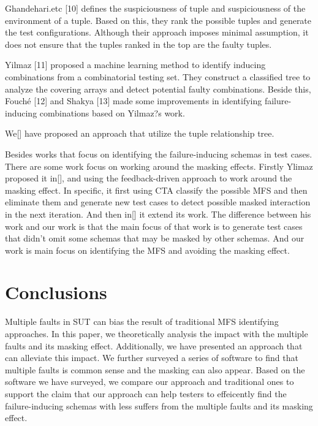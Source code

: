\documentclass{sig-alternate}
\begin{document}
Ghandehari.etc [10] defines the suspiciousness of tuple and suspiciousness of the environment of a tuple. Based on this, they rank the possible tuples and generate the test configurations. Although their approach imposes minimal assumption, it does not ensure that the tuples ranked in the top are the faulty tuples.

Yilmaz [11] proposed a machine learning method to identify inducing combinations from a combinatorial testing set. They construct a classified tree to analyze the covering arrays and detect potential faulty combinations. Beside this, Fouché [12] and Shakya [13] made some improvements in identifying failure-inducing combinations based on Yilmaz?s work.

We[] have proposed an approach that utilize the tuple relationship tree.

Besides works that focus on identifying the failure-inducing schemas in test cases. There are some work focus on working around the masking effects. Firstly Ylimaz proposed it in[], and using the feedback-driven approach to work around the masking effect. In specific, it first using CTA classify the possible MFS and then eliminate them and generate new test cases to detect possible masked interaction in the next iteration.  And then in[] it extend its work. The difference between his work and our work is that the main focus of that work is to generate test cases that didn't omit some schemas that may be masked by other schemas. And our work is main focus on identifying the MFS and avoiding the masking effect.

\section{Conclusions}
Multiple faults in SUT can bias the result of traditional MFS identifying approaches. In this paper, we theoretically analysis the impact with the multiple faults and its masking effect. Additionally, we have presented an approach that can alleviate this impact. We further surveyed a series of software to find that multiple faults is common sense and the masking can also appear. Based on the software we have surveyed, we compare our approach and traditional ones to support the claim that our approach can help testers to effeicently find the failure-inducing schemas with less suffers from the multiple faults and its masking effect.

\end{document}
